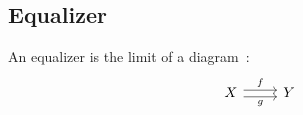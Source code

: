 \subsection{Equalizer}

\begin{definition}[Equalizer]

  An equalizer is the limit of a
  diagram~\parencite[p.~112]{leinster:basic_category_theory}:
  \[\begin{tikzcd}[ampersand replacement=\&]
    X \& Y
    \arrow["f", shift left=1, from=1-1, to=1-2]
    \arrow["g"', shift right=1, from=1-1, to=1-2]
  \end{tikzcd}\]
\end{definition}